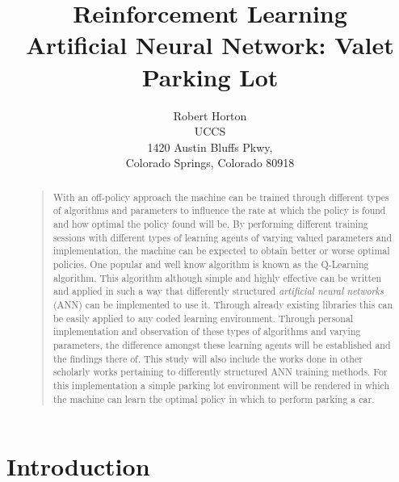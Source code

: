 \documentclass[letterpaper]{article}
\begin{document}
%
\title{Reinforcement Learning\\ Artificial Neural Network: Valet Parking Lot }
\author{Robert Horton\\
UCCS\\
1420 Austin Bluffs Pkwy,\\
Colorado Springs, Colorado 80918\\
}
\maketitle

\begin{abstract}
\begin{quote}
With an off-policy approach the machine can be trained through different types of algorithms and parameters to influence the rate at which the policy is found and how optimal the policy found will be. By performing different training sessions with different types of learning agents of varying valued parameters and implementation, the machine can be expected to obtain better or worse optimal policies.  One popular and well know algorithm is known as the Q-Learning algorithm.  This algorithm although simple and highly effective can be written and applied in such a way that differently structured \textit{artificial neural networks} (ANN) can be implemented to use it.  Through already existing libraries this can be easily applied to any coded learning environment.  Through personal implementation and observation of these types of algorithms and varying parameters, the difference amongst these learning agents will be established and the findings there of. This study will also include the works done in other scholarly works pertaining to differently structured ANN training methods. For this implementation a simple parking lot environment will be rendered in which the machine can learn the optimal policy in which to perform parking a car.

\end{quote}
\end{abstract}

\section{Introduction}
\end{document}
